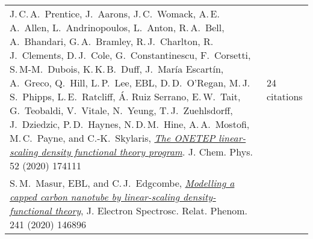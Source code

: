 \documentclass[10pt,a4paper,final]{article}
\begin{document}
\begin{tabularx}{\textwidth}{
      m{}%
      m{}}
   J.\,C.\,A.\ Prentice, J.\ Aarons, J.\,C.\ Womack, A.\,E.\,A.\ Allen, L.\ Andrinopoulos, L.\ Anton, R.\,A.\ Bell, A.\ Bhandari, G.\,A.\ Bramley, R.\,J.\ Charlton, R.\,J.\ Clements, D.\,J.\ Cole, G.\ Constantinescu, F.\ Corsetti, S.\,M-M.\ Dubois, K.\,K.\,B.\ Duff, J.\ María Escartín, A.\ Greco, Q.\ Hill, L.\,P.\ Lee, EBL, D.\,D.\ O’Regan, M.\,J.\,S.\ Phipps, L.\,E.\ Ratcliff, Á. Ruiz Serrano, E.\,W.\ Tait, G.\ Teobaldi, V.\ Vitale, N.\ Yeung, T.\,J.\ Zuehlsdorff, J.\ Dziedzic, P.\,D.\ Haynes, N.\,D.\,M.\ Hine, A.\,A.\ Mostofi, M.\,C.\ Payne, and C.-K.\ Skylaris, \href{https://aip.scitation.org/doi/full/10.1063/5.0004445}{\textit{The ONETEP linear-scaling density functional theory program}}. J. Chem. Phys. 52 (2020) 174111 & 24 citations                                    \\
   S.\,M.\ Masur, EBL, and C.\,J.\ Edgcombe, \href{https://www.sciencedirect.com/science/article/pii/S036820481930221X}{\textit{Modelling a capped carbon nanotube by linear-scaling density-functional theory}}, J. Electron Spectrosc. Relat. Phenom. 241 (2020) 146896                                                                                                                                                                                                                                                                                                                                                                                                                                                                                     &
\end{tabularx}
\end{document}
